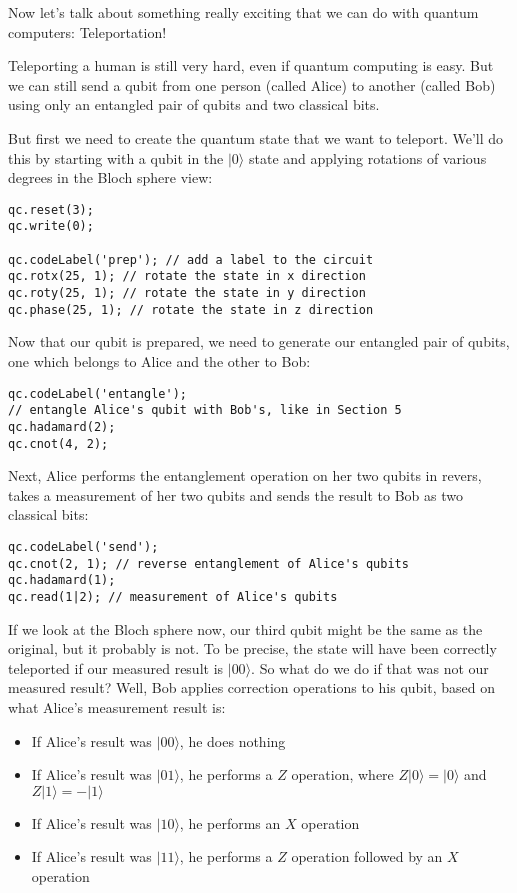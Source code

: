 \documentclass[twocolumn]{article}
\begin{document}
Now let's talk about something really exciting that we can do with quantum computers: Teleportation!

Teleporting a human is still very hard, even if quantum computing is easy. But we can still send a qubit from one person (called Alice) to another (called Bob) using only an entangled pair of qubits and two classical bits.

But first we need to create the quantum state that we want to teleport. We'll do this by starting with a qubit in the $|0\rangle$ state and applying rotations of various degrees in the Bloch sphere view:

\begin{lstlisting}
qc.reset(3);
qc.write(0);

qc.codeLabel('prep'); // add a label to the circuit
qc.rotx(25, 1); // rotate the state in x direction
qc.roty(25, 1); // rotate the state in y direction
qc.phase(25, 1); // rotate the state in z direction
\end{lstlisting}

Now that our qubit is prepared, we need to generate our entangled pair of qubits, one which belongs to Alice and the other to Bob:

\begin{lstlisting}
qc.codeLabel('entangle');
// entangle Alice's qubit with Bob's, like in Section 5
qc.hadamard(2);
qc.cnot(4, 2);
\end{lstlisting}

Next, Alice performs the entanglement operation on her two qubits in revers, takes a measurement of her two qubits and sends the result to Bob as two classical bits:

\begin{lstlisting}
qc.codeLabel('send');
qc.cnot(2, 1); // reverse entanglement of Alice's qubits
qc.hadamard(1);
qc.read(1|2); // measurement of Alice's qubits
\end{lstlisting}

If we look at the Bloch sphere now, our third qubit might be the same as the original, but it probably is not. To be precise, the state will have been correctly teleported if our measured result is $|00\rangle$. So what do we do if that was not our measured result? Well, Bob applies correction operations to his qubit, based on what Alice's measurement result is:

\begin{itemize}
\item If Alice's result was $|00\rangle$, he does nothing
\item If Alice's result was $|01\rangle$, he performs a $Z$ operation, where $Z|0\rangle = |0\rangle$ and $Z|1\rangle = -|1\rangle$
\item If Alice's result was $|10\rangle$, he performs an $X$ operation
\item If Alice's result was $|11\rangle$, he performs a $Z$ operation followed by an $X$ operation
\end{itemize}
\end{document}
